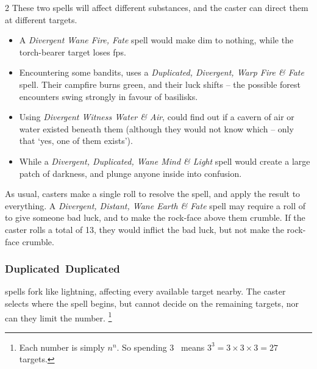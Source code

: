 \begin{multicols}{2}
These two spells will affect different substances, and the caster can direct them at different targets.

\begin{itemize}
  \item
  A \textit{Divergent Wane Fire, Fate} spell would make  dim to nothing, while the torch-bearer target loses \glspl{fp}.
  \item
  Encountering some bandits,  uses a \textit{Duplicated, Divergent, Warp Fire \& Fate} spell.
  Their campfire burns green, and their luck shifts -- the possible forest encounters swing strongly in favour of \glspl{basilisk}.
  \item
  Using \textit{Divergent Witness Water \& Air},  could find out if a cavern of air or water existed beneath them (although they would not know which -- only that `yes, one of them exists').
  \item
  While a \textit{Divergent, Duplicated, Wane Mind \& Light} spell would create a large patch of darkness, and plunge anyone inside into confusion.
\end{itemize}

As usual, casters make a single roll to resolve the spell, and apply the result to everything.
A \textit{Divergent, Distant, Wane Earth \& Fate} spell may require a roll of \tn[7] to give someone bad luck, and \tn[14] to make the rock-face above them crumble.
If the caster rolls a total of 13, they would inflict the bad luck, but not make the rock-face crumble.

\subsubsection[Duplicated]{\gls{Duplicated}~Duplicated}
\label{duplicatedDesc}
spells fork like lightning, affecting every available target nearby.
The caster selects where the spell begins, but cannot decide on the remaining targets, nor can they limit the number.%
\footnote{Each number is simply $n^n$.  So spending 3~ means $3^3 = 3\times 3\times 3 = 27$ targets.}



\end{multicols}
